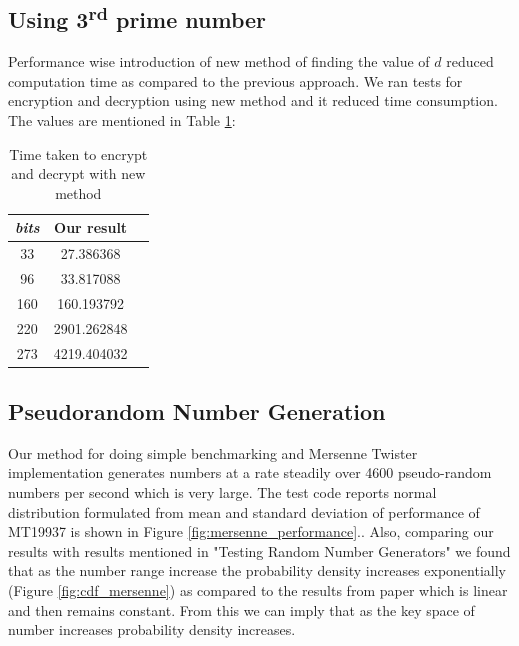 \documentclass[12pt,journal,compsoc]{IEEEtran}
\begin{document}
\subsection{Using 3\textsuperscript{rd} prime number}
Performance wise introduction of new method of finding the value of $d$ reduced computation time as compared to the previous approach. We ran tests for encryption and decryption using new method and it reduced time consumption. The values are mentioned in Table \ref{table:4.2}:
\begin{table}[ht]
	\begin{center}
	\begin{tabular}{|c|c|c|}
    	\hline
       		\emph{bits}	&		Our result\\
	\hline
    		33			&	27.386368\\
		96			&	33.817088\\
		160			&	160.193792\\
		220			&	2901.262848\\
		273			&	4219.404032\\
	\hline
	\end{tabular}
	\end{center}
	\caption{Time taken to encrypt and decrypt with new method}
	\label{table:4.2}
\end{table}

\subsection{{Pseudorandom Number Generation}}
Our method for doing simple benchmarking and Mersenne Twister implementation generates numbers at a rate steadily over 4600 pseudo-random numbers per second which is very large. The test code reports normal distribution formulated from mean and standard deviation of performance of MT19937 is shown in Figure \ref{fig:mersenne_performance}.\cite{wolfram_mt}. Also, comparing our results with results mentioned in "Testing Random Number Generators"\cite{lcg_cdf} we found that as the number range increase the probability density increases exponentially (Figure \ref{fig:cdf_mersenne}) as compared to the results from paper\cite{lcg_cdf} which is linear and then remains constant. From this we can imply that as the key space of number increases probability density increases.
\end{document}
